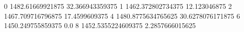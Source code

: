 0 1482.61669921875 32.366943359375
1 1462.372802734375 12.123046875
2 1467.709716796875 17.4599609375
4 1480.8775634765625 30.6278076171875
6 1450.249755859375 0.0
8 1452.5355224609375 2.2857666015625
